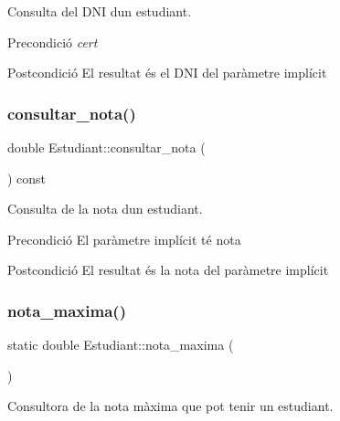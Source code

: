 Consulta del D\+NI d\textquotesingle{}un estudiant. 

\begin{DoxyPrecond}{Precondició}
{\itshape cert} 
\end{DoxyPrecond}
\begin{DoxyPostcond}{Postcondició}
El resultat és el D\+NI del paràmetre implícit 
\end{DoxyPostcond}
\mbox{\label{class_estudiant_a21afbb59cddf87258d600df04ab95397}} 
\subsubsection{\texorpdfstring{consultar\+\_\+nota()}{consultar\_nota()}}
{\footnotesize\ttfamily double Estudiant\+::consultar\+\_\+nota (\begin{DoxyParamCaption}{ }\end{DoxyParamCaption}) const}



Consulta de la nota d\textquotesingle{}un estudiant. 

\begin{DoxyPrecond}{Precondició}
El paràmetre implícit té nota 
\end{DoxyPrecond}
\begin{DoxyPostcond}{Postcondició}
El resultat és la nota del paràmetre implícit 
\end{DoxyPostcond}
\mbox{\label{class_estudiant_a5df5eed414c87a2a1c2efa4194633afd}} 
\subsubsection{\texorpdfstring{nota\+\_\+maxima()}{nota\_maxima()}}
{\footnotesize\ttfamily static double Estudiant\+::nota\+\_\+maxima (\begin{DoxyParamCaption}{ }\end{DoxyParamCaption})\hspace{0.3cm}{\ttfamily [static]}}



Consultora de la nota màxima que pot tenir un estudiant. 

